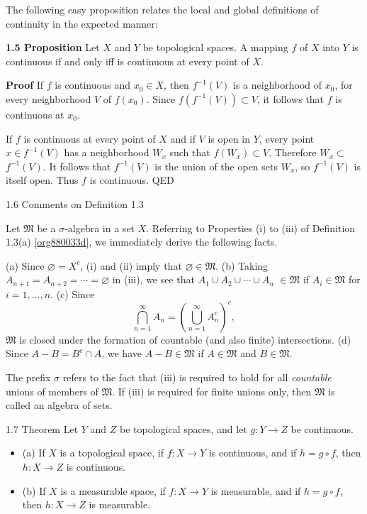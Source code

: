 \documentclass[11pt]{article}
\begin{document}
The following easy proposition relates the local and global definitions of continuity in the expected manner:

\medskip
\label{orgd10888b}
\textbf{\textbf{1.5 Proposition}} Let \(X\) and \(Y\) be topological spaces. A mapping \(f\) of \(X\) into \(Y\) is continuous if and only iff is continuous at every point of \(X\).

\textbf{Proof} If \(f\) is continuous and \(x_0 \in X\), then \(f^{-1}(V)\) is a neighborhood of \(x_0\), for every neighborhood \(V\) of \(f\left(x_0\right)\). Since \(f\left(f^{-1}(V)\right) \subset V\), it follows that \(f\) is continuous at \(x_0\).

If \(f\) is continuous at every point of \(X\) and if \(V\) is open in \(Y\), every point \(x \in f^{-1}(V)\) has a neighborhood \(W_x\) such that \(f\left(W_x\right) \subset V\). Therefore \(W_x \subset\) \(f^{-1}(V)\). It follows that \(f^{-1}(V)\) is the union of the open sets \(W_x\), so \(f^{-1}(V)\) is itself open. Thus \(f\) is continuous. QED

\medskip
\label{org55aa1ad}
1.6 Comments on Definition 1.3

Let \(\mathfrak{M}\) be a \(\sigma\)-algebra in a set \(X\). Referring to Properties (i) to (iii) of Definition 1.3(a) \ref{org880033d}, we immediately derive the following facts.

(a) Since \(\varnothing=X^c\), (i) and (ii) imply that \(\varnothing \in \mathfrak{M}\).
(b) Taking \(A_{n+1}=A_{n+2}=\cdots=\varnothing\) in (iii), we see that \(A_1 \cup A_2 \cup \cdots \cup A_n\) \(\in \mathfrak{M}\) if \(A_i \in \mathfrak{M}\) for \(i=1, \ldots, n\).
(c) Since
\[
\bigcap_{n=1}^{\infty} A_n=\left(\bigcup_{n=1}^{\infty} A_n^c\right)^c,
\]
\(\mathfrak{M}\) is closed under the formation of countable (and also finite) intersections.
(d) Since \(A-B=B^c \cap A\), we have \(A-B \in \mathfrak{M}\) if \(A \in \mathfrak{M}\) and \(B \in \mathfrak{M}\).

The prefix \(\sigma\) refers to the fact that (iii) is required to hold for all \emph{countable} unions of members of \(\mathfrak{M}\). If (iii) is required for finite unions only, then \(\mathfrak{M}\) is called an algebra of sets.

\medskip
\label{org1d4cf1d}
1.7 Theorem Let \(Y\) and \(Z\) be topological spaces, and let \(g: Y \rightarrow Z\) be continuous.

\begin{itemize}
\item (a) If \(X\) is a topological space, if \(f: X \rightarrow Y\) is continuous, and if \(h=g \circ f\), then \(h: X \rightarrow Z\) is continuous.
\item (b) If \(X\) is a measurable space, if \(f: X \rightarrow Y\) is measurable, and if \(h=g \circ f\), then \(h: X \to Z\) is measurable.
\end{itemize}
\end{document}
